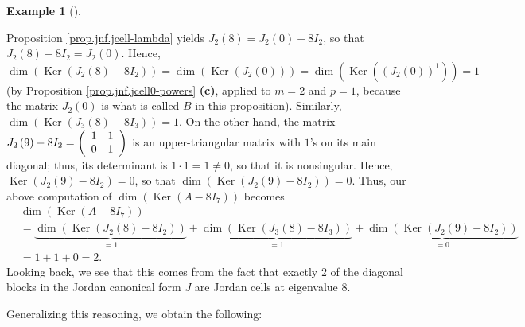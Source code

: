\documentclass[numbers=enddot,12pt,final,onecolumn,notitlepage]{scrartcl}%
\numberwithin{exer}{subsection}
\theoremstyle{definition}
\newtheorem{exam}[theo]{Example}
\newenvironment{example}[1][]
{\begin{exam}[#1]\begin{leftbar}}
{\end{leftbar}\end{exam}}
\begin{document}
\begin{example}
Proposition \ref{prop.jnf.jcell-lambda} yields $J_{2}\left(  8\right)
=J_{2}\left(  0\right)  +8I_{2}$, so that $J_{2}\left(  8\right)
-8I_{2}=J_{2}\left(  0\right)  $. Hence,%
\[
\dim\left(  \operatorname*{Ker}\left(  J_{2}\left(  8\right)  -8I_{2}\right)
\right)  =\dim\left(  \operatorname*{Ker}\left(  J_{2}\left(  0\right)
\right)  \right)  =\dim\left(  \operatorname*{Ker}\left(  \left(  J_{2}\left(
0\right)  \right)  ^{1}\right)  \right)  =1
\]
(by Proposition \ref{prop.jnf.jcell0-powers} \textbf{(c)}, applied to $m=2$
and $p=1$, because the matrix $J_{2}\left(  0\right)  $ is what is called $B$
in this proposition). Similarly, $\dim\left(  \operatorname*{Ker}\left(
J_{3}\left(  8\right)  -8I_{3}\right)  \right)  =1$. On the other hand, the
matrix $J_{2}\left(  9\right)  -8I_{2}=\left(
\begin{array}
[c]{cc}%
1 & 1\\
0 & 1
\end{array}
\right)  $ is an upper-triangular matrix with $1$'s on its main diagonal;
thus, its determinant is $1\cdot1=1\neq0$, so that it is nonsingular. Hence,
$\operatorname*{Ker}\left(  J_{2}\left(  9\right)  -8I_{2}\right)  =0$, so
that $\dim\left(  \operatorname*{Ker}\left(  J_{2}\left(  9\right)
-8I_{2}\right)  \right)  =0$. Thus, our above computation of $\dim\left(
\operatorname*{Ker}\left(  A-8I_{7}\right)  \right)  $ becomes%
\begin{align*}
&  \dim\left(  \operatorname*{Ker}\left(  A-8I_{7}\right)  \right) \\
&  =\underbrace{\dim\left(  \operatorname*{Ker}\left(  J_{2}\left(  8\right)
-8I_{2}\right)  \right)  }_{=1}+\underbrace{\dim\left(  \operatorname*{Ker}%
\left(  J_{3}\left(  8\right)  -8I_{3}\right)  \right)  }_{=1}%
+\underbrace{\dim\left(  \operatorname*{Ker}\left(  J_{2}\left(  9\right)
-8I_{2}\right)  \right)  }_{=0}\\
&  =1+1+0=2.
\end{align*}
Looking back, we see that this comes from the fact that exactly $2$ of the
diagonal blocks in the Jordan canonical form $J$ are Jordan cells at
eigenvalue $8$.
\end{example}

Generalizing this reasoning, we obtain the following:
\end{document}
